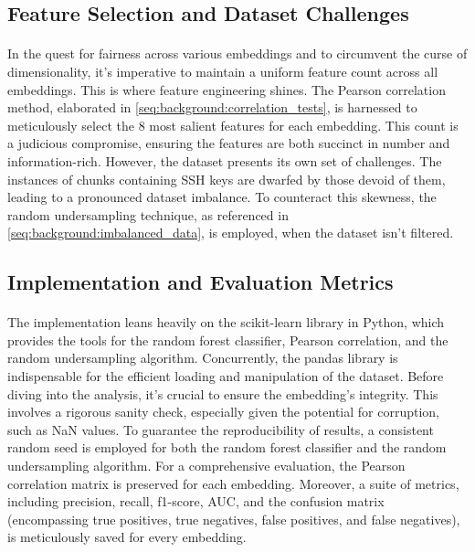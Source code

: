 \subsection{Feature Selection and Dataset Challenges}

\paragraph{}In the quest for fairness across various embeddings and to circumvent the curse of dimensionality, it's imperative to maintain a uniform feature count across all embeddings. This is where feature engineering shines. The Pearson correlation method, elaborated in \ref{seq:background:correlation_tests}, is harnessed to meticulously select the 8 most salient features for each embedding. This count is a judicious compromise, ensuring the features are both succinct in number and information-rich. However, the dataset presents its own set of challenges. The instances of \glspl{chunk} containing SSH keys are dwarfed by those devoid of them, leading to a pronounced dataset imbalance. To counteract this skewness, the random undersampling technique, as referenced in \ref{seq:background:imbalanced_data}, is employed, when the dataset isn't filtered.

\subsection{Implementation and Evaluation Metrics}

\paragraph{}The implementation leans heavily on the scikit-learn library \cite{pedregosa_scikit-learn_2011} in Python, which provides the tools for the random forest classifier, Pearson correlation, and the random undersampling algorithm. Concurrently, the pandas library is indispensable for the efficient loading and manipulation of the dataset. Before diving into the analysis, it's crucial to ensure the embedding's integrity. This involves a rigorous sanity check, especially given the potential for corruption, such as NaN values. To guarantee the reproducibility of results, a consistent random seed is employed for both the random forest classifier and the random undersampling algorithm. For a comprehensive evaluation, the Pearson correlation matrix is preserved for each embedding. Moreover, a suite of metrics, including precision, recall, f1-score, AUC, and the confusion matrix (encompassing true positives, true negatives, false positives, and false negatives), is meticulously saved for every embedding.
